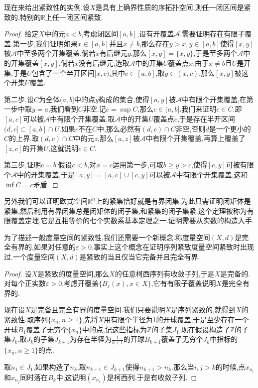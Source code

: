 现在来给出紧致性的实例.设$X$是具有上确界性质的序拓扑空间,则任一闭区间是紧致的,特别的$\mathbb{R}$上任一闭区间紧致.
\begin{proof}
	
	给定$X$中的元$a<b$,考虑闭区间$[a,b]$,设有开覆盖$\mathscr{A}$.需要证明存在有限子覆盖.第一步,我们证明如果$x\in[a,b]$并且$x\not=b$,那么存在$y>x,y\in[a,b]$使得$[x,y]$被$\mathscr{A}$中至多两个开集覆盖.倘若$x$有后继元$y$,那么$[x,y]=\{x,y\}$,于是至多两个$\mathscr{A}$中的开集覆盖$[x,y]$.倘若$x$没有后继元,选取$\mathscr{A}$中的开集$U$覆盖点$x$,由于$x\not=b$且$U$是开集,于是$U$包含了一个半开区间$[x,c)$,其中$c\in[a,b]$,取$y\in(x,c)$,那么$[x,y]$被这个开集$U$覆盖.
	
	第二步,设$C$为全体$(a,b]$中的点$y$构成的集合,使得$[a,y]$被$\mathscr{A}$中有限个开集覆盖,在第一步中取$y=a$,我们看到$C$非空.记$c=\sup C$,那么$c\in(a,b]$.我们来证明$c\in C$.即$[a,c]$可以被$\mathscr{A}$中有限个开集覆盖.取$\mathscr{A}$中的开集$U$覆盖点$c$,于是存在半开区间$(d,c]\subset[a,b]\cap U$.如果$c$不在$C$中,那么必然有$(d,c)\cap C$非空,否则$d$是一个更小的$C$的上界.取$(d,c)\cap C$中的元$z$,那么$[a,z]$被$\mathscr{A}$中有限个开集覆盖,再算上覆盖了$[z,c]$的开集$U$,这就说明$c\in C$.
	
	第三步,证明$c=b$.假设$c<b$,对$x=c$运用第一步,可取$b\ge y>c$,使得$[c,y]$可被有限个$\mathscr{A}$中的开集覆盖,于是$[a,y]=[a,c]\cup[c,y]$可以被$\mathscr{A}$中有限个开集覆盖,这和$\inf C=c$矛盾.
\end{proof}

另外我们可以证明欧式空间$\mathbb{R}^n$上的紧集恰好就是有界闭集.为此只需证明闭矩体是紧集,然后利用有界闭集总是闭矩体的闭子集,和紧集的闭子集紧.这个定理被称为有限覆盖定理,它是互相等价的七个实数系基本定理之一.证明需要从实数的构造入手.

为了描述一般度量空间的紧致性,我们还需要一个新概念.称度量空间$(X,d)$是完全有界的,如果对任意的$\varepsilon>0$.事实上这个概念在证明序列紧致度量空间紧致时出现过.一个度量空间$(X,d)$是紧致的当且仅当它完备并且完全有界.
\begin{proof}
	
	设$X$是紧致的度量空间,那么$X$的任意柯西序列有收敛子列,于是$X$是完备的.对每个正实数$\varepsilon>0$,考虑开覆盖$\{B_{\varepsilon}(x),x\in X\}$,它有有限子覆盖说明$X$是完全有界的.
	
	现在设$X$是完备且完全有界的度量空间.我们只要说明$X$是序列紧致的,就得到$X$的紧致性.取序列$\{x_n,n\ge1\}$,先将$X$用有限个半径为1的开球覆盖,于是至少存在一个开球$B_1$覆盖了无穷个$\{x_n\}$中的点,记这些指标为$\mathbb{Z}$的子集$J_1$.现在假设构造了$\mathbb{Z}$的子集$J_k$,取$J_k$的子集$J_{k+1}$为存在半径为$\frac{1}{k+1}$的开球$B_{k+1}$覆盖了无穷个$J_k$中指标的$\{x_n,n\ge1\}$的点.
	
	取$n_1\in J_1$,如果构造了$n_k$,取$n_{k+1}\in J_{k+1}$使得$n_{k+1}>n_k$.那么当$i,j>k$的时候,点$x_{n_i}$和$x_{n_j}$同时落在$B_k$中,这说明$(x_{n_i})$是柯西列,于是有收敛子列.
\end{proof}

